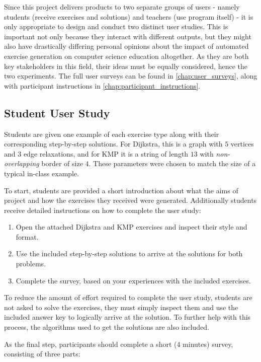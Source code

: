 \documentclass{l4proj}
\begin{document}
Since this project delivers products to two separate groups of users - namely students (receive exercises and solutions) and teachers (use program itself) - it is only appropriate to design and conduct two distinct user studies. This is important not only because they interact with different outputs, but they might also have drastically differing personal opinions about the impact of automated exercise generation on computer science education altogether. As they are both key stakeholders in this field, their ideas must be equally considered, hence the two experiments. The full user surveys can be found in \autoref{chap:user_surveys}, along with participant instructions in \autoref{chap:participant_instructions}.

\subsection{Student User Study}

Students are given one example of each exercise type along with their corresponding step-by-step solutions. For Dijkstra, this is a graph with $5$ vertices and $3$ edge relaxations, and for KMP it is a string of length $13$ with \emph{non-overlapping} border of size $4$. These parameters were chosen to match the size of a typical in-class example. 

To start, students are provided a short introduction about what the aims of project and how the exercises they received were generated. Additionally students receive detailed instructions on how to complete the user study:
\begin{enumerate}
	\item
	Open the attached Dijkstra and KMP exercises and inspect their style and format.
	\item
	Use the included step-by-step solutions to arrive at the solutions for both problems.
	\item
	Complete the survey, based on your experiences with the included exercises.
\end{enumerate}

To reduce the amount of effort required to complete the user study, students are not asked to solve the exercises, they must simply inspect them and use the included answer key to logically arrive at the solution. To further help with this process, the algorithms used to get the solutions are also included.

As the final step, participants should complete a short (4 minutes) survey, consisting of three parts:
\end{document}
